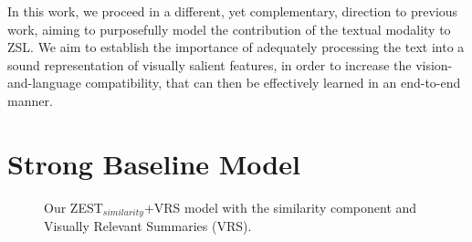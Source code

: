 \documentclass[11pt,a4paper]{article}
\newcommand\yuval[1]{\textcolor{darkpink}{\textbf{YUVAL:} #1 }}
\begin{document}
In this work, we proceed in a different, yet complementary, direction to previous work, aiming to purposefully model the contribution of the textual modality to ZSL.
We aim to establish the importance of adequately processing the text into a sound representation of visually salient features, in order to increase the vision-and-language compatibility, that can then be effectively learned in an end-to-end manner.




\section{Strong Baseline Model}
\label{task}



\begin{figure}[th]
\centering
{}
 \caption{Our ZEST$_{similarity}$+VRS model with the similarity component and Visually Relevant Summaries (VRS).}
\label{fig:model}
\end{figure}
\end{document}
